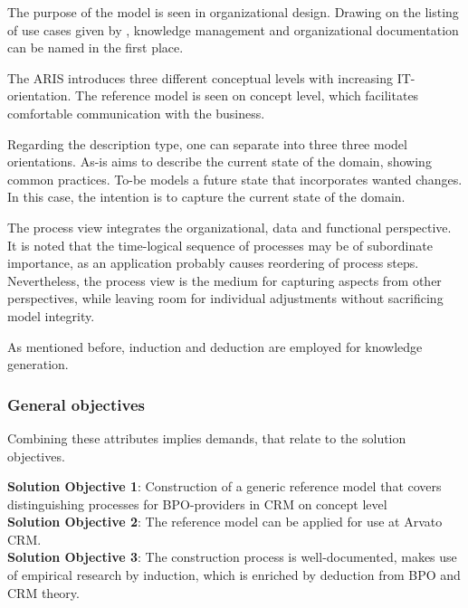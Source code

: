 The purpose of the model is seen in organizational design. Drawing on the listing of use cases given by \citep[]{Rosemann2012proc}, knowledge management and organizational documentation can be named in the first place. 

The \acrshort{ARIS} introduces three different conceptual levels with increasing IT-orientation. The reference model is seen on concept level, which facilitates comfortable communication with the business. 
\todo{+++}

Regarding the description type, one can separate into three three model orientations. As-is aims to describe the current state of the domain, \viz showing common practices. To-be models a future state that incorporates wanted changes. In this case, the intention is to capture the current state of the domain. 

The process view integrates the organizational, data and functional perspective. It is noted that the time-logical sequence of processes may be of subordinate importance, as an application probably causes reordering of process steps. Nevertheless, the process view is the medium for capturing aspects from other perspectives, while leaving room for individual adjustments without sacrificing model integrity. 

As mentioned before, induction and deduction are employed for knowledge generation.
 
\subsubsection{General objectives}
Combining these attributes implies demands, that relate to the solution objectives.

\hfill\begin{minipage}{\dimexpr\textwidth-1.2cm}
	\textbf{Solution Objective 1}: Construction of a generic  reference model that covers distinguishing processes for BPO-providers in CRM on concept level
	\\
	
	\textbf{Solution Objective 2}: The reference model can be applied for use at Arvato CRM.  
	\\
	
	\textbf{Solution Objective 3}: The construction  process is well-documented, makes use of empirical research by induction, which is enriched by deduction from \acrshort{BPO} and \acrshort{CRM} theory.
	
	\xdef\tpd{\the\prevdepth}
\end{minipage}

